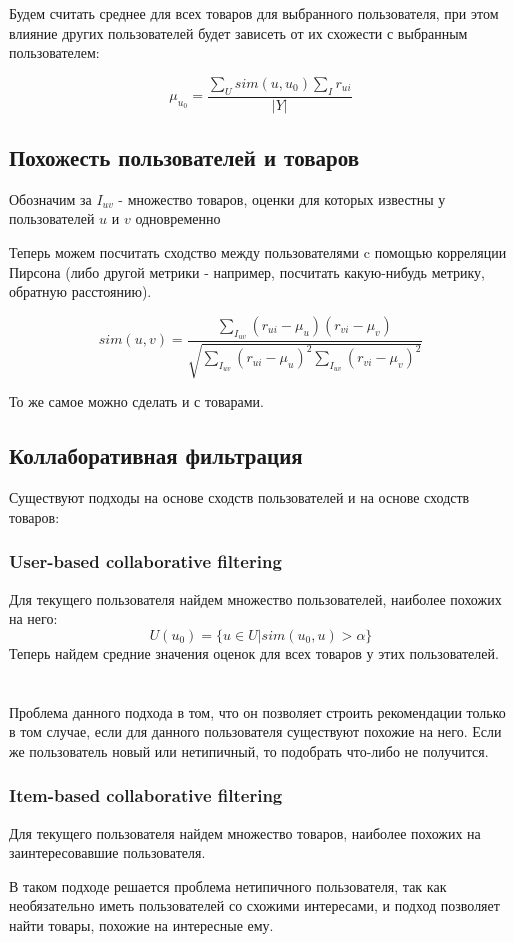  Будем считать среднее для всех товаров для выбранного пользователя, при этом
влияние других пользователей будет зависеть от их схожести с выбранным
пользователем:

$$\mu_{u_0} = \frac{\sum_U sim(u, u_0) \sum_I r_{ui}}{|Y|}$$

\subsection{Похожесть пользователей и товаров}
Обозначим за $I_{uv}$ - множество товаров, оценки для которых известны у пользователей $u$ и $v$ одновременно

Теперь можем посчитать сходство между пользователями c помощью корреляции Пирсона (либо другой метрики - например, посчитать какую-нибудь метрику, обратную расстоянию).

$$sim(u, v) = \frac{\sum_{I_{uv}} (r_{ui} - \mu_u)(r_{vi} - \mu_v)}{\sqrt{\sum_{I_{uv}} (r_{ui} - \mu_u)^2 \sum_{I_{uv}} (r_{vi} - \mu_v)^2}}$$

То же самое можно сделать и с товарами.

\subsection{Коллаборативная фильтрация}
Существуют подходы на основе сходств пользователей и на основе сходств товаров:
\subsubsection{User-based collaborative filtering}
Для текущего пользователя найдем множество пользователей, наиболее похожих на него:
$$U(u_0) = \{u \in U | sim(u_0, u) > \alpha \}$$
Теперь найдем средние значения оценок для всех товаров у этих пользователей.
\\
\\
\\
Проблема данного подхода в том, что он позволяет строить рекомендации только в том случае, если для данного пользователя существуют похожие на него. Если же
пользователь новый или нетипичный, то подобрать что-либо не получится.
\subsubsection{Item-based collaborative filtering}
Для текущего пользователя найдем множество товаров, наиболее похожих на заинтересовавшие пользователя.

В таком подходе решается проблема нетипичного пользователя, так как необязательно иметь пользователей со схожими интересами, и подход позволяет найти товары, похожие на интересные ему. 

